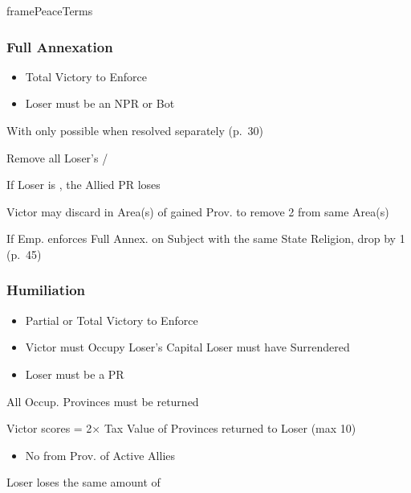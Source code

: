 \documentclass[10pt]{article}
\newlength{\fhPeaceTerms} \setlength\fhPeaceTerms{45.5\baselineskip}
\begin{document}
\begin{dynamiccontents*}{framePeaceTerms}
\begin{eubox}{\fhPeaceTerms}
\begin{multicols}{3}
		\subsubsection*{Full Annexation}
		\begin{itemize}
			{
				\color{peaceReqColor}
				\item {}
				\begin{itemize}
					\item Total Victory to Enforce
					\item Loser must be an NPR or Bot
				\end{itemize}
			}
			\item With  only possible when resolved separately (p.~30)
			\item Remove all Loser's \alliances/\marriages
			\item If Loser is \activeally, the Allied PR loses 
			\item Victor may discard \claims in Area(s) of gained Prov. to remove 2 \unrest from same Area(s)
			\item If Emp. enforces Full Annex. on Subject with the same State Religion, drop \authority by 1 (p.~45)
		\end{itemize}

		\subsubsection*{Humiliation}
		\begin{itemize}
			{
				\color{peaceReqColor}
				\item \strong{Requirements}
				\begin{itemize}
					\item Partial or Total Victory to Enforce
					\item Victor must Occupy Loser's Capital  Loser must have Surrendered
					\item Loser must be a PR
				\end{itemize}
			}
			\item All Occup. Provinces must be returned
			\item Victor scores \prestige = 2× Tax Value of Provinces returned to Loser (max 10)
			\begin{itemize}
				\item No \prestige from Prov. of Active Allies
			\end{itemize}
			\item Loser loses the same amount of \prestige
		\end{itemize}


\end{multicols}
\end{eubox}
\end{dynamiccontents*}
\end{document}
